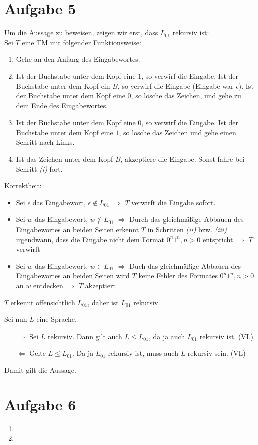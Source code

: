 \documentclass[a4paper,11pt]{scrartcl}
\begin{document}
	\section*{Aufgabe 5}
	Um die Aussage zu beweisen, zeigen wir erst, dass $L_{01}$ rekursiv ist:\\
	Sei $T$ eine TM mit folgender Funktionsweise:
	\begin{enumerate}
	\item Gehe an den Anfang des Eingabewortes.
	\item Ist der Buchstabe unter dem Kopf eine $1$, so verwirf die Eingabe. Ist der Buchstabe unter dem Kopf ein $B$, so verwirf die Eingabe (Eingabe war $\epsilon$). Ist der Buchstabe unter dem Kopf eine $0$, so lösche das Zeichen, und gehe zu dem Ende des Eingabewortes.
	\item Ist der Buchstabe unter dem Kopf eine $0$, so verwirf die Eingabe. Ist der Buchstabe unter dem Kopf eine $1$, so lösche das Zeichen und gehe einen Schritt nach Links.
	\item Ist das Zeichen unter dem Kopf $B$, akzeptiere die Eingabe. Sonst fahre bei Schritt \textit{(i)} fort.
	\end{enumerate}
	Korrektheit:
	\begin{itemize}
	\item Sei $\epsilon$ das Eingabewort, $\epsilon \not\in L_{01}$ $\Rightarrow$ $T$ verwirft die Eingabe sofort.
	\item Sei $w$ das Eingabewort, $w \not\in L_{01}$ $\Rightarrow$ Durch das gleichmäßige Abbauen des Eingabewortes an beiden Seiten erkennt $T$ in Schritten \textit{(ii)} bzw. \textit{(iii)} irgendwann, dass die Eingabe nicht dem Format $0^n1^n, n>0$ entspricht $\Rightarrow$ $T$ verwirft
	\item Sei $w$ das Eingabewort, $w \in L_{01}$ $\Rightarrow$ Duch das gleichmäßige Abbauen des Eingabewortes an beiden Seiten wird $T$ keine Fehler des Formates $0^n1^n, n>0$ an $w$ entdecken $\Rightarrow$ $T$ akzeptiert
	\end{itemize}
	$T$ erkennt offensichtlich $L_{01}$, daher ist $L_{01}$ rekursiv.	
	
	Sei nun $L$ eine Sprache.
	\begin{itemize}
	\item[$\Rightarrow$] Sei $L$ rekursiv. Dann gilt auch $L \leq L_{01}$, da ja auch $L_{01}$ rekursiv ist. (VL)
	\item[$\Leftarrow$] Gelte $L \leq L_{01}$. Da ja $L_{01}$ rekursiv ist, muss auch $L$ rekursiv sein. (VL)
	\end{itemize}
	Damit gilt die Aussage.
	
\newpage
	\section*{Aufgabe 6}
	\begin{enumerate}[label=\alph*)]
	\item	
			
	\item	
			
	\end{enumerate}
	
\end{document}
